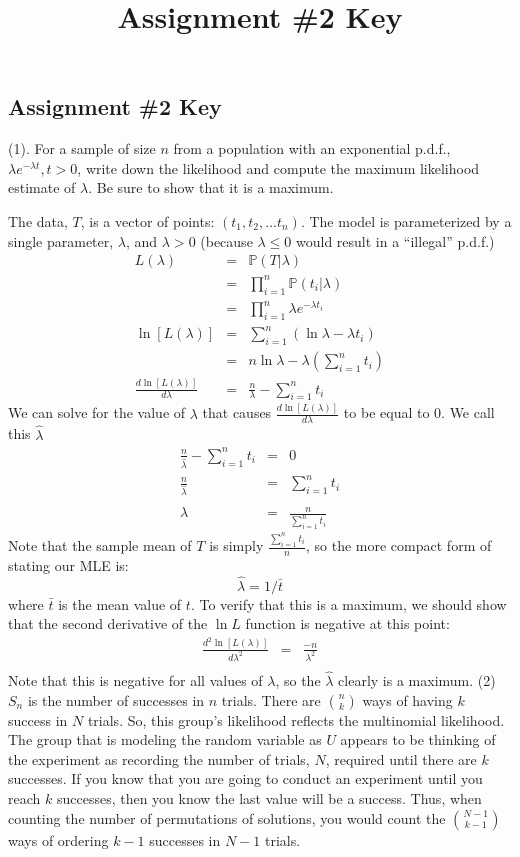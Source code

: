 \documentclass[11pt]{article}
\title{Assignment \#2 Key}
\renewcommand{\Pr}{{\mathbb P}}
\begin{document}
\subsection*{Assignment \#2 Key}
(1). For a sample of size $n$ from a population with an exponential p.d.f., $\lambda e^{-\lambda t},t > 0$, write down the likelihood and compute the maximum likelihood estimate of $\lambda$. Be sure to show that it is a maximum.

The data, $T$, is a vector of points: $(t_1,t_2,\ldots t_n)$.
The model is parameterized by a single parameter, $\lambda$, and $\lambda> 0$ (because $\lambda \leq 0$ would result in a ``illegal'' p.d.f.)
\begin{eqnarray*}
	L(\lambda) & = &\Pr(T|\lambda) \\
		& = & \prod_{i=1}^{n}\Pr(t_i|\lambda)\\
		& = & \prod_{i=1}^{n}\lambda e^{-\lambda t_i}\\
	\ln[L(\lambda)]& = & \sum_{i=1}^{n}\left(\ln \lambda -\lambda t_i\right) \\
		& = & n\ln \lambda - \lambda \left(\sum_{i=1}^{n}t_i\right) \\
	\frac{d\ln[L(\lambda)]}{d\lambda}& = & \frac{n}{\lambda} - \sum_{i=1}^{n}t_i
\end{eqnarray*}
We can solve for the value of $\lambda$ that causes $\frac{d\ln[L(\lambda)]}{d\lambda}$ to be equal to 0.
We call this $\hat{\lambda}$
\begin{eqnarray*}
	\frac{n}{\hat{\lambda}} - \sum_{i=1}^{n}t_i & = & 0 \\
	\frac{n}{\hat{\lambda}}  & = & \sum_{i=1}^{n}t_i \\
	\hat{\lambda} & = & \frac{n}{\sum_{i=1}^{n}t_i}
\end{eqnarray*}
Note that the sample mean of $T$ is simply $\frac{\sum_{i=1}^{n}t_i}{n}$, so the more compact form of stating our MLE is:
	$$\hat{\lambda} =  1/\bar{t}$$
where $\bar{t}$ is the mean value of $t$. 
To verify that this is a maximum, we should show that the second derivative of the $\ln L$ function is negative at this point:
\begin{eqnarray*}
	\frac{d^2\ln[L(\lambda)]}{d\lambda^2}& = & \frac{-n}{\lambda^2} \\
\end{eqnarray*}
Note that this is negative for all values of $\lambda$, so the $\hat{\lambda}$ clearly is a maximum.
\newpage
(2) $S_n$ is the number of successes in $n$ trials. There are $n \choose k$ ways of having $k$ success in $N$ trials. So, this group's likelihood reflects the multinomial likelihood.\\
The group that is modeling the random variable as $U$ appears to be thinking of the experiment as recording the number of trials, $N$, required until there are $k$ successes.
If you know that you are going to conduct an experiment until you reach $k$ successes, then you know the last value will be a success.
Thus, when counting the number of permutations of solutions, you would count the $N-1 \choose k - 1$ ways of ordering $k-1$ successes in $N-1$ trials.
\end{document}
